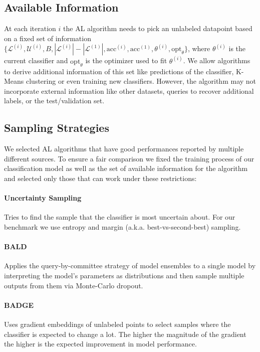 \documentclass[]{article}
\begin{document}
\subsection{Available Information}
At each iteration $i$ the AL algorithm needs to pick an unlabeled datapoint based on a fixed set of information $\{\mathcal{L}^{(i)}, \mathcal{U}^{(i)}, B, |\mathcal{L}^{(i)}|-|\mathcal{L}^{(1)}|, \text{acc}^{(i)}, \text{acc}^{(1)}, \theta^{(i)}, \text{opt}_\theta\}$, where $\theta^{(i)}$ is the current classifier and $\text{opt}_\theta$ is the optimizer used to fit $\theta^{(i)}$.
We allow algorithms to derive additional information of this set like predictions of the classifier, K-Means clustering or even training new classifiers.
However, the algorithm may not incorporate external information like other datasets, queries to recover additional labels, or the test/validation set.

\subsection{Sampling Strategies}\label{sec:sampling_strategies}
We selected AL algorithms that have good performances reported by multiple different sources.
To ensure a fair comparison we fixed the training process of our classification model as well as the set of available information for the algorithm and selected only those that can work under these restrictions:
\paragraph{Uncertainty Sampling} 
Tries to find the sample that the classifier is most uncertain about. For our benchmark we use entropy and margin (a.k.a. best-vs-second-best) sampling.
\paragraph{BALD \cite{kirsch2019batchbald}}
Applies the query-by-committee strategy of model ensembles to a single model by interpreting the model's parameters as distributions and then sample multiple outputs from them via Monte-Carlo dropout.
\paragraph{BADGE \cite{ashdeep}} Uses gradient embeddings of unlabeled points to select samples where the classifier is expected to change a lot. The higher the magnitude of the gradient the higher is the expected improvement in model performance.
\end{document}
